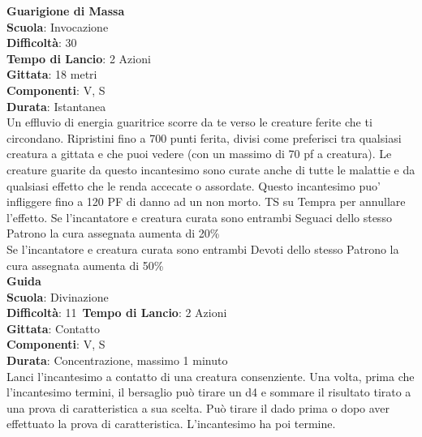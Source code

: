 \begin{multicols}{2}
\medskip\textbf{Guarigione di Massa}\\
\textbf{Scuola}: Invocazione\\
\textbf{Difficoltà}: 30\\
\textbf{Tempo di Lancio}: 2 Azioni\\
\textbf{Gittata}: 18 metri\\
\textbf{Componenti}: V, S\\
\textbf{Durata}: Istantanea\\
Un effluvio di energia guaritrice scorre da te verso le creature ferite che ti circondano. Ripristini fino a 700 punti ferita, divisi come preferisci tra qualsiasi creatura a gittata e che puoi vedere (con un massimo di 70 pf a creatura). Le creature guarite da questo incantesimo sono curate anche di tutte le malattie e da qualsiasi effetto che le renda accecate o assordate. Questo incantesimo puo' infliggere fino a 120 PF di danno ad un non morto. TS su Tempra per annullare l'effetto.
Se l'incantatore e creatura curata sono entrambi Seguaci dello stesso Patrono la cura assegnata aumenta di 20\%\\
Se l'incantatore e creatura curata sono entrambi Devoti dello stesso Patrono la cura assegnata aumenta di 50\%\\

\medskip\textbf{Guida}\\
\textbf{Scuola}: Divinazione\\
\textbf{Difficoltà}: 11\
\textbf{Tempo di Lancio}: 2 Azioni\\
\textbf{Gittata}: Contatto\\
\textbf{Componenti}: V, S\\
\textbf{Durata}: Concentrazione, massimo 1 minuto\\
Lanci l'incantesimo a contatto di una creatura consenziente. Una volta, prima che l'incantesimo termini, il bersaglio può tirare un d4 e sommare il risultato tirato a una prova di caratteristica a sua scelta. Può tirare il dado prima o dopo aver effettuato la prova di caratteristica. L'incantesimo ha poi termine. 


\end{multicols}
